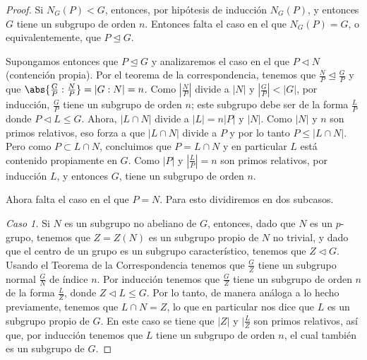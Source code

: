 \begin{proof}
    Si $N_G(P) < G$, entonces, por hipótesis de inducción $N_G(P)$, y entonces $G$ tiene un subgrupo de orden $n$. Entonces
    falta el caso en el que $N_G(P) = G$, o equivalentemente, que $P \trianglelefteq G$.\pn
    
    Supongamos entonces que $P \trianglelefteq G$ y analizaremos el caso en el que $P \triangleleft N$ (contención propia). Por el teorema de la correspondencia, 
    tenemos que $\frac{N}{P} \trianglelefteq \frac{G}{P}$ y que $\abs{\frac{G}{P} : \frac{N}{P}} = | G :N | = n$. Como $|\frac{N}{P}|$
    divide a $|N|$ y $|\frac{G}{P}| < |G|$, por inducción, $\frac{G}{P}$ tiene un subgrupo de orden $n$; este subgrupo debe ser de la forma 
    $\frac{L}{P}$ donde $P \triangleleft L \leq G$. Ahora, $| L \cap N |$ divide a $|L| = n|P|$ y $|N|$. Como $|N|$  y $n$ son primos relativos, 
    eso forza a que $|L \cap N|$ divide a $P$ y por lo tanto $P \leq |L \cap N|$. Pero como $P \subset L \cap N$, concluimos que $P = L \cap N$ y en
    particular $L$ está contenido propiamente en $G$. Como $|P|$ y $| \frac{L}{P}| = n$ son primos relativos, por inducción $L$, y entonces $G$, tiene
    un subgrupo de orden $n$.\pn
    
    Ahora falta el caso en el que $P = N$. Para esto dividiremos en dos subcasos.

    \textit{Caso 1. }
    Si $N$ es un subgrupo no abeliano de $G$, entonces, dado que $N$ es un $p$-grupo, tenemos que $Z=Z(N)$ es un subgrupo propio de $N$ no trivial, y dado que el centro de un grupo es un subgrupo caracter\'istico, tenemos que $Z\vartriangleleft G$. Usando el Teorema de la Correspondencia tenemos que $\frac{G}{Z}$ tiene un subgrupo normal $\frac{G}{N}$ de \'indice $n$. Por inducción tenemos que $\frac{G}{Z}$ tiene un subgrupo de orden $n$ de la forma $\frac{L}{Z}$, donde $Z\vartriangleleft L\leq G$. Por lo tanto, de manera an\'aloga a lo hecho previamente, tenemos que $L\cap N = Z$, lo que en particular nos dice que $L$ es un subgrupo propio de $G$. En este caso se tiene que $|Z|$ y $|\frac{L}{Z}$ son primos relativos, as\'i que, por inducción tenemos que $L$ tiene un subgrupo de orden $n$, el cual también es un subgrupo de $G$.


\end{proof}
